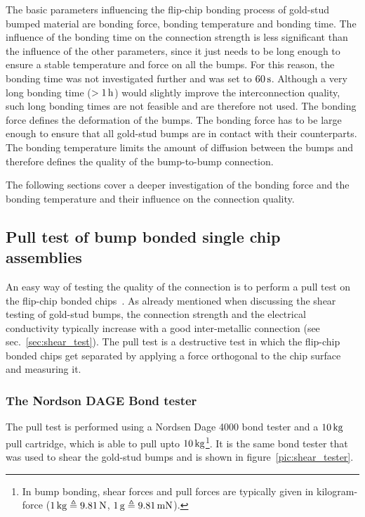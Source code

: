 The basic parameters influencing the flip-chip bonding process of gold-stud bumped material are bonding force, bonding temperature and bonding time. The influence of the bonding time on the connection strength is less significant than the influence of the other parameters, since it just needs to be long enough to ensure a stable temperature and force on all the bumps. For this reason, the bonding time was not investigated further and was set to $60\,\rm{s}$. Although a very long bonding time ($>1\,\rm{h}$) would slightly improve the interconnection quality, such long bonding times are not feasible and are therefore not used. The bonding force defines the deformation of the bumps. The bonding force has to be large enough to ensure that all gold-stud bumps are in contact with their counterparts. The bonding temperature limits the amount of diffusion between the bumps and therefore defines the quality of the bump-to-bump connection.

The following sections cover a deeper investigation of the bonding force and the bonding temperature and their influence on the connection quality. 

\subsection{Pull test of bump bonded single chip assemblies}
An easy way of testing the quality of the connection is to perform a pull test on the flip-chip bonded chips~\cite{DOD13}. As already mentioned when discussing the shear testing of gold-stud bumps, the connection strength and the electrical conductivity typically increase with a good inter-metallic connection (see sec.~\ref{sec:shear_test}). The pull test is a destructive test in which the flip-chip bonded chips get separated by applying a force orthogonal to the chip surface and measuring it.

\subsubsection{The Nordson DAGE Bond tester}
The pull test is performed using a Nordsen Dage 4000 bond tester and a $10\,\rm{kg}$ pull cartridge, which is able to pull upto $10\,\rm{kg}$\footnote{In bump bonding, shear forces and pull forces are typically given in kilogram-force ($1\,\rm{kg}\triangleq 9.81\,\rm{N}$, $1\,\rm{g}\triangleq 9.81\,\rm{mN}$).}. It is the same bond tester that was used to shear the gold-stud bumps and is shown in figure~\ref{pic:shear_tester}.

